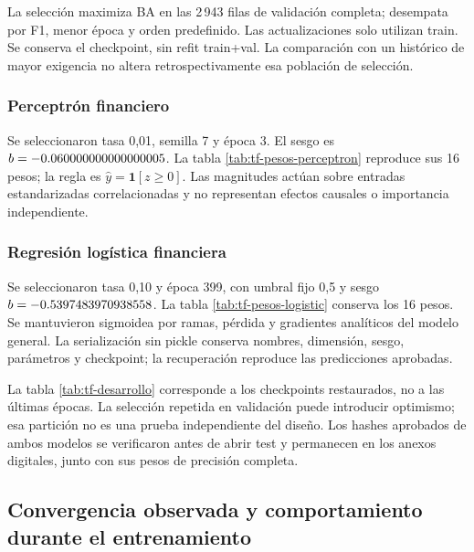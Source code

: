 La selección maximiza BA en las 2\,943 filas de validación completa; desempata por F1, menor época y orden predefinido. Las actualizaciones solo utilizan train. Se conserva el checkpoint, sin refit train+val. La comparación con un histórico de mayor exigencia no altera retrospectivamente esa población de selección.

\subsubsection{Perceptrón financiero}
Se seleccionaron tasa 0,01, semilla 7 y época 3. El sesgo es $b=-0.060000000000000005$. La tabla \ref{tab:tf-pesos-perceptron} reproduce sus 16 pesos; la regla es $\widehat y=\mathbf1[z\geq0]$. Las magnitudes actúan sobre entradas estandarizadas correlacionadas y no representan efectos causales o importancia independiente.


\subsubsection{Regresión logística financiera}
Se seleccionaron tasa 0,10 y época 399, con umbral fijo 0,5 y sesgo $b=-0.5397483970938558$. La tabla \ref{tab:tf-pesos-logistic} conserva los 16 pesos. Se mantuvieron sigmoidea por ramas, pérdida  y gradientes analíticos del modelo general. La serialización sin pickle conserva nombres, dimensión, sesgo, parámetros y checkpoint; la recuperación reproduce las predicciones aprobadas.

La tabla \ref{tab:tf-desarrollo} corresponde a los checkpoints restaurados, no a las últimas épocas. La selección repetida en validación puede introducir optimismo; esa partición no es una prueba independiente del diseño. Los hashes aprobados de ambos modelos se verificaron antes de abrir test y permanecen en los anexos digitales, junto con sus pesos de precisión completa.

\clearpage
\subsection{Convergencia observada y comportamiento durante el entrenamiento}

